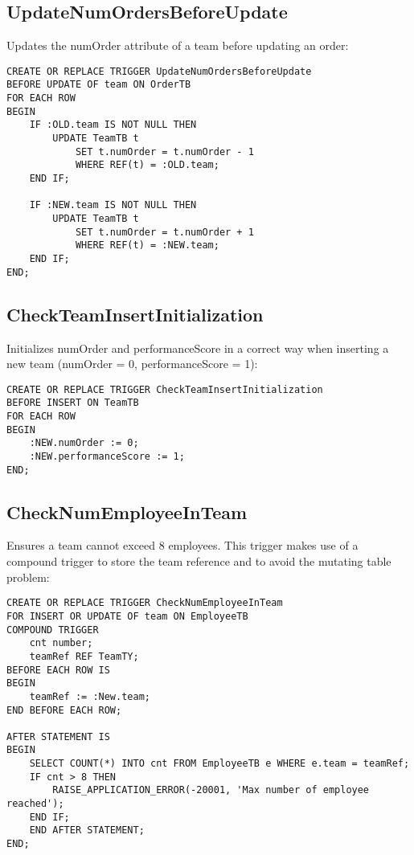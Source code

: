 \subsection*{UpdateNumOrdersBeforeUpdate}
Updates the numOrder attribute of a team before updating an order:
\begin{lstlisting}
CREATE OR REPLACE TRIGGER UpdateNumOrdersBeforeUpdate
BEFORE UPDATE OF team ON OrderTB
FOR EACH ROW
BEGIN
    IF :OLD.team IS NOT NULL THEN
        UPDATE TeamTB t
            SET t.numOrder = t.numOrder - 1
            WHERE REF(t) = :OLD.team;
    END IF;

    IF :NEW.team IS NOT NULL THEN
        UPDATE TeamTB t
            SET t.numOrder = t.numOrder + 1
            WHERE REF(t) = :NEW.team;
    END IF;
END;
\end{lstlisting}

\subsection*{CheckTeamInsertInitialization}
Initializes numOrder and performanceScore in a correct way when inserting a new team (numOrder = 0, performanceScore = 1):
\begin{lstlisting}
CREATE OR REPLACE TRIGGER CheckTeamInsertInitialization
BEFORE INSERT ON TeamTB
FOR EACH ROW
BEGIN
    :NEW.numOrder := 0;
    :NEW.performanceScore := 1;
END;
\end{lstlisting}

\subsection*{CheckNumEmployeeInTeam}
Ensures a team cannot exceed 8 employees. This trigger makes use of a compound trigger to store the team reference and to avoid the mutating table problem:
\begin{lstlisting}
CREATE OR REPLACE TRIGGER CheckNumEmployeeInTeam
FOR INSERT OR UPDATE OF team ON EmployeeTB
COMPOUND TRIGGER
    cnt number;
    teamRef REF TeamTY;
BEFORE EACH ROW IS
BEGIN
    teamRef := :New.team;
END BEFORE EACH ROW;

AFTER STATEMENT IS
BEGIN
    SELECT COUNT(*) INTO cnt FROM EmployeeTB e WHERE e.team = teamRef;
    IF cnt > 8 THEN
        RAISE_APPLICATION_ERROR(-20001, 'Max number of employee reached');
    END IF;
    END AFTER STATEMENT;
END;
\end{lstlisting}

